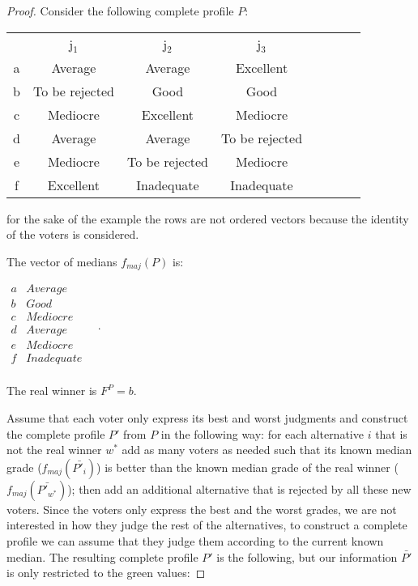 \documentclass[version=3.21, pagesize, twoside=off, bibliography=totoc, DIV=calc, fontsize=12pt, a4paper]{scrartcl}
\begin{document}
\begin{proof} Consider the following complete profile $P$:

	\begin{center}
		\begin{tabular}{cccccccc}
			& j$_1$ & j$_2$ & j$_3$ \\
			a	&	Average	&	Average	&	Excellent	\\
			b	&	To be rejected	&	Good	&	Good	\\
			c	&	Mediocre	&	Excellent	&	Mediocre	\\
			d	&	Average	&	Average	&	To be rejected	\\
			e	&	Mediocre	&	To be rejected	&	Mediocre	\\
			f	&	Excellent	&	Inadequate	&	Inadequate \\
		\end{tabular}
	\end{center}
	
	
	for the sake of the example the rows are not ordered vectors because the identity of the voters is considered.
	
	The vector of medians $f_{maj}(P)$ is:
	\begin{center}
		$
		\begin{array}{cc}
			a &	Average \\
			b &	Good \\
			c &	Mediocre \\
			d &	Average	\\
			e &	Mediocre \\
			f & Inadequate \\
		\end{array} \quad.
		$
	\end{center}
	The real winner is $F^P=b$. 
	
	Assume that each voter only express its best and worst judgments and construct the complete profile $P'$ from $P$ in the following way: for each alternative $i$ that is not the real winner $w^*$ add as many voters as needed such that its known median grade ($f_{maj}(\bar{P'_i})$) is better than the known median grade of the real winner ($f_{maj}(\bar{P'_{w^*}})$); then add an additional alternative that is rejected by all these new voters. Since the voters only express the best and the worst grades, we are not interested in how they judge the rest of the alternatives, to construct a complete profile we can assume that they judge them according to the current known median. The resulting complete profile $P'$ is the following, but our information $\bar{P'}$ is only restricted to the green values: 


\end{proof}
\end{document}
